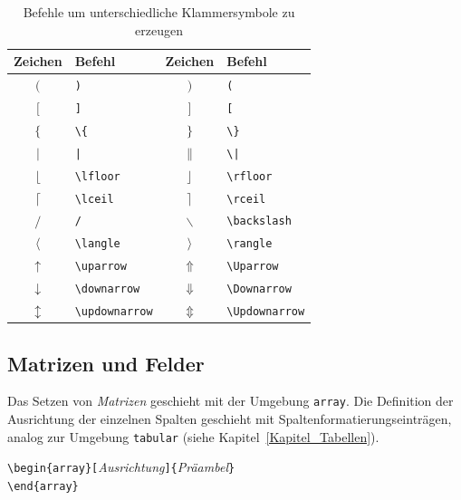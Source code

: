 \documentclass[a4paper,10pt,twoside]{scrbook}
\begin{document}
{\begin{table}[h!tb]
\centering
\caption{Befehle um unterschiedliche Klammersymbole zu erzeugen}
\label{Tabelle_Klammern_Befehle}       %
\begin{tabular}{clcl}
\hline
Zeichen & Befehl & Zeichen & Befehl \\
\hline
$($ & \texttt{)}  & 
$)$ & \texttt{(}  \\
$[$ & \texttt{]}  &
$]$ & \texttt{[}  \\
$\{$ & \texttt{\textbackslash \{} &
$\}$ & \texttt{\textbackslash \}} \\
$|$ & \texttt{|} &
$\|$ & \texttt{\textbackslash |} \\
$\lfloor$ & \texttt{\textbackslash lfloor} &
$\rfloor$ & \texttt{\textbackslash rfloor} \\ 
$\lceil$ & \texttt{\textbackslash lceil} &
$\rceil$ & \texttt{\textbackslash rceil} \\
$/$ & \texttt{/} &  
$\backslash$ & \texttt{\textbackslash backslash} \\
$\langle$ & \texttt{\textbackslash langle} &
$\rangle$ & \texttt{\textbackslash rangle} \\  
$\uparrow$ & \texttt{\textbackslash uparrow} &
$\Uparrow$ & \texttt{\textbackslash Uparrow} \\
$\downarrow$ & \texttt{\textbackslash downarrow} &  
$\Downarrow$ & \texttt{\textbackslash Downarrow} \\
$\updownarrow$ & \texttt{\textbackslash updownarrow} &
$\Updownarrow$ & \texttt{\textbackslash Updownarrow}  \\
\hline
\end{tabular}
\end{table}




\subsection{Matrizen und Felder}

Das Setzen von \textsl{Matrizen} geschieht mit der Umgebung
\verb!array!. 
Die Definition der Ausrichtung der einzelnen Spalten geschieht mit 
Spaltenformatierungseinträgen, analog zur Umgebung \verb!tabular! (siehe Kapitel~\ref{Kapitel_Tabellen}).


\begin{boxedminipage}{\textwidth}
\texttt{\textbackslash begin\{array\}[}\textsl{Ausrichtung}\texttt{]\{}\textsl{Präambel}\texttt{\}} \\
\texttt{\textbackslash end\{array\}} 
\end{boxedminipage}

}
\end{document}
